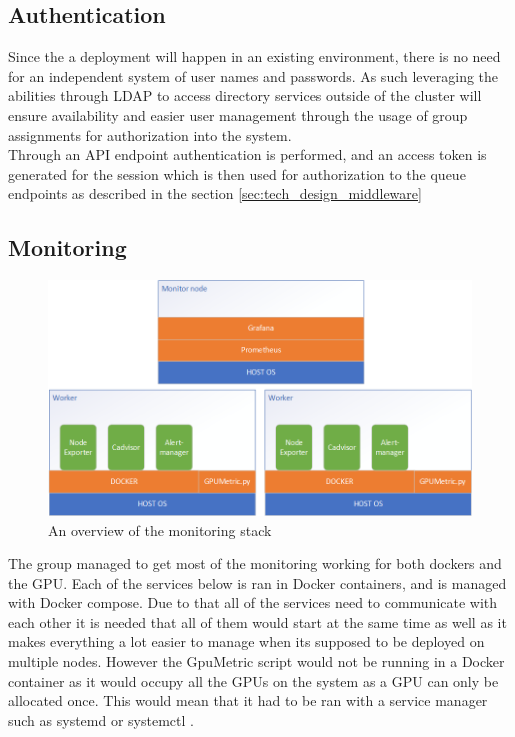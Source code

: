 \documentclass[../main.tex]{subfiles}
\begin{document}
\subsection*{Authentication}
Since the a deployment will happen in an existing environment, there is no need for an independent system of user names and passwords. As such leveraging the abilities through LDAP to access directory services outside of the cluster will ensure availability and easier user management through the usage of group assignments for authorization into the system.\\
Through an API endpoint authentication is performed, and an access token is generated for the session which is then used for authorization to the queue endpoints as described in the section \ref{sec:tech_design_middleware}


\subsection{Monitoring}
\begin{figure}[H]
    \centering
    \includegraphics[scale=0.8]{img/Monitoring_stack.png}
    \caption{An overview of the monitoring stack}
    \label{fig:Monitoring_stack}
\end{figure}
The group managed to get most of the monitoring working for both dockers and the GPU. Each of the services below is ran in Docker containers, and is managed with Docker compose. Due to that all of the services need to communicate with each other it is needed that all of them would start at the same time as well as it makes everything a lot easier to manage when its supposed to be deployed on multiple nodes. However the GpuMetric script would not be running in a Docker container as it would occupy all the GPUs on the system as a GPU can only be allocated once. This would mean that it had to be ran with a service manager such as systemd \cite{systemd} or systemctl \cite{systemctl}. 
\end{document}
